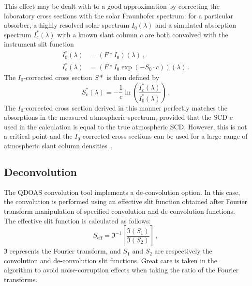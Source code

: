 This effect may be dealt with to a good approximation by correcting
the laboratory cross sections with the solar Fraunhofer spectrum: for
a particular absorber, a highly resolved solar spectrum $I_0(\lambda)$
and a simulated absorption spectrum $I^*_c(\lambda)$ with a known slant
column $c$ are both convolved with the instrument slit function
\begin{align}
  I_0^*(\lambda)&= (F \ast I_0) (\lambda)\, ,\\
  I^*_c (\lambda) &= (F \ast I_0 \exp( -S_0 \cdot c)) (\lambda)\,.
\end{align}
The $I_0$-corrected cross section $S*$ is then defined by
\begin{equation}
  \label{eq:I0_corrected_cross_section}
  S^*_c(\lambda) = -\frac{1}{c}\ln \left(
    \frac{ I^*_c(\lambda) }{I^*_0(\lambda)}
  \right)\,.
\end{equation}
The $I_0$-corrected cross section derived in this manner perfectly
matches the absorptions in the measured atmospheric spectrum, provided
that the SCD $c$ used in the calculation is equal to the true
atmospheric SCD. However, this is not a critical point and the $I_0$
corrected cross sections can be used for a large range of atmospheric
slant column densities~\citep{Wagner1999}.

\subsection{Deconvolution}\label{sec:deconvolution}
The QDOAS convolution tool implements a de-convolution option. In this
case, the convolution is performed using an effective slit function
obtained after Fourier transform manipulation of specified convolution
and de-convolution functions. The effective slit function is
calculated as follows:
\begin{equation}
  \label{eq:deconvolution}
  S_{\mathrm{eff}} = \mathfrak{I}^{-1} \left[
    \frac{ \mathfrak{I}(S_1) }{\mathfrak{I}(S_2)}
    \right]\,,
\end{equation}
$\mathfrak{I}$ represents the Fourier transform, and $S_1$ and $S_2$ are
respectively the convolution and de-convolution slit functions. Great
care is taken in the algorithm to avoid noise-corruption effects when
taking the ratio of the Fourier transforms.

